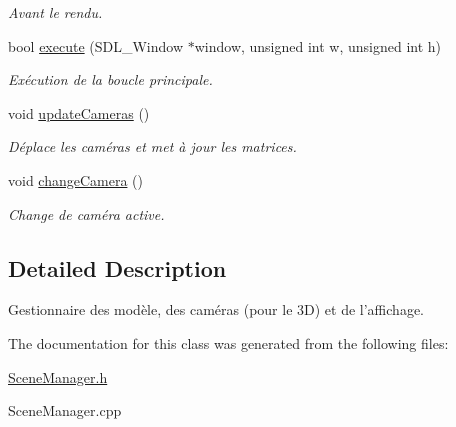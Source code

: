 \begin{DoxyCompactItemize}
\begin{DoxyCompactList}\small\item\em Avant le rendu. \end{DoxyCompactList}\item 
\hypertarget{classSceneManager_abbdf898b3f5161018bbc2761fa6a49dd}{bool \hyperlink{classSceneManager_abbdf898b3f5161018bbc2761fa6a49dd}{execute} (S\+D\+L\+\_\+\+Window $\ast$window, unsigned int w, unsigned int h)}\label{classSceneManager_abbdf898b3f5161018bbc2761fa6a49dd}

\begin{DoxyCompactList}\small\item\em Exécution de la boucle principale. \end{DoxyCompactList}\item 
\hypertarget{classSceneManager_ab063fdc682ba6a8abe4a02a228f27aab}{void \hyperlink{classSceneManager_ab063fdc682ba6a8abe4a02a228f27aab}{update\+Cameras} ()}\label{classSceneManager_ab063fdc682ba6a8abe4a02a228f27aab}

\begin{DoxyCompactList}\small\item\em Déplace les caméras et met à jour les matrices. \end{DoxyCompactList}\item 
\hypertarget{classSceneManager_a153fdb0850c95f9c75730a9e76fbd7e0}{void \hyperlink{classSceneManager_a153fdb0850c95f9c75730a9e76fbd7e0}{change\+Camera} ()}\label{classSceneManager_a153fdb0850c95f9c75730a9e76fbd7e0}

\begin{DoxyCompactList}\small\item\em Change de caméra active. \end{DoxyCompactList}\end{DoxyCompactItemize}


\subsection{Detailed Description}
Gestionnaire des modèle, des caméras (pour le 3\+D) et de l'affichage. 

The documentation for this class was generated from the following files\+:\begin{DoxyCompactItemize}
\item 
\hyperlink{SceneManager_8h}{Scene\+Manager.\+h}\item 
Scene\+Manager.\+cpp\end{DoxyCompactItemize}
